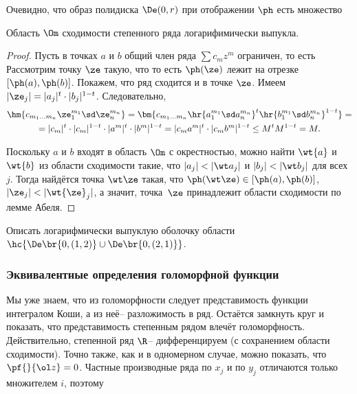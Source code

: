 \documentclass[a4paper]{article}
\begin{document}
Очевидно, что образ полидиска $\De(0,r)$ при отображении $\ph$ есть множество

\begin{theorem}
Область $\Om$ сходимости степенного ряда логарифимически выпукла.
\end{theorem}
\begin{proof}
Пусть в точках $a$ и $b$ общий член ряда $\sum c_m z^m$ ограничен, то есть
Рассмотрим точку $\ze$ такую, что
то есть $\ph(\ze)$ лежит на отрезке $[\ph(a),\ph(b)]$. Покажем, что ряд сходится и в точке $\ze$. Имеем
$|\ze_j|=|a_j|^t \cdot |b_j|^{1-t}$. Следовательно,
\begin{multline}
\hm{c_{m_1\ldots m_n}\ze_1^{m_1} \sd \ze_n^{m_n}}=\bm{c_{m_1\ldots m_n}
\hr{a_1^{m_1} \sd a_n^{m_n}}^t \hr{b_1^{m_1} \sd b_n^{m_n}}^{1-t}} =\\=
|c_m|^t\cdot |c_m|^{1-t}\cdot |a^m|^t\cdot |b^m|^{1-t} = |c_m a^m|^t \cdot |c_m b^m|^{1-t} \le M^t M^{1-t} = M.
\end{multline}

Поскольку $a$ и $b$ входят в область $\Om$ с окрестностью, можно найти $\wt{a}$ и $\wt{b}$ из области
сходимости такие, что $|a_j| < |\wt a_j|$ и $|b_j| < |\wt b_j|$ для всех $j$.
Тогда найдётся точка $\wt \ze$ такая, что $\ph(\wt \ze) \in [\ph(a),\ph(b)]$,
$|\ze_j| < |\wt{\ze}_j|$, а значит, точка~$\ze$ принадлежит области сходимости по лемме Абеля.
\end{proof}

\begin{problem}
Описать логарифмически выпуклую оболочку области
$\hc{\De\br{0,(1,2)}\cup \De\br{0,(2,1)}}$.
\end{problem}

\subsubsection{Эквивалентные определения голоморфной функции}

Мы уже знаем, что из голоморфности следует представимость функции интегралом Коши, а из неё--
разложимость в ряд. Остаётся замкнуть круг и показать, что представимость степенным рядом
влечёт голоморфность. Действительно, степенной ряд $\R$-- дифференцируем (с сохранением области
сходимости). Точно также, как и в одномерном случае, можно показать, что $\pf{}{\ol z} = 0$.
Частные производные ряда по $x_j$ и по $y_j$ отличаются только множителем $i$, поэтому
\end{document}
